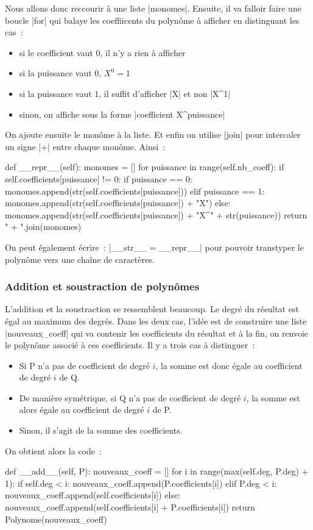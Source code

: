 		Nous allons donc reccourir à une liste \python|monomes|. Ensuite, il va falloir faire une boucle \python|for| qui balaye les coeffiicents du polynôme à afficher en distinguant les cas~:
		\begin{itemize}
			\item si le coefficient vaut $0$, il n'y a rien à afficher
			\item si la puissance vaut $0$, $X^0 = 1$
			\item si la puissance vaut $1$, il suffit d'afficher \python|X| et non \python|X^1|
			\item sinon, on affiche sous la forme \python|coefficient X^puissance|
		\end{itemize}
		On ajoute ensuite le monôme à la liste. Et enfin on utilise \python|join| pour intercaler un signe \python|+| entre chaque monôme. Ainsi~:
		\begin{pythoncode}
			def __repr__(self):
		    monomes = []
		    for puissance in range(self.nb_coeff):
		        if self.coefficients[puissance] != 0:
		            if puissance == 0:
		                monomes.append(str(self.coefficients[puissance]))
		            elif puissance == 1:
		                monomes.append(str(self.coefficients[puissance]) + "X")
		            else:
		                monomes.append(str(self.coefficients[puissance]) + "X^" + str(puissance))
		    return " + ".join(monomes)
		\end{pythoncode}
		
		On peut également écrire~: \python|__str__ = __repr__| pour pouvoir transtyper le polynôme vers une chaîne de caractères.
		
		\subsubsection{Addition et soustraction de polynômes}
		L'addition et la soustraction se ressemblent beaucoup. Le degré du résultat est égal au maximum des degrés. Dans les deux cas, l'idée est de construire une liste \python|nouveaux_coeff| qui va contenir les coefficients du résultat et à la fin, on renvoie le polynôme associé à ces coefficients. Il y a trois cas à distinguer~:
		\begin{itemize}
			\item Si P n'a pas de coefficient de degré $i$, la somme est donc égale au coefficient de degré $i$ de Q.
			\item De manière symétrique, si Q n'a pas de coefficient de degré $i$, la somme est alors égale au coefficient de degré $i$ de P.
			\item Sinon, il s'agit de la somme des coefficients.
		\end{itemize}
		On obtient alors la code~:
		\begin{pythoncode}
			def __add__(self, P):
				nouveaux_coeff = []
				for i in range(max(self.deg, P.deg) + 1):
				    if self.deg < i:
				        nouveaux_coeff.append(P.coefficients[i])
				    elif P.deg < i:
				        nouveaux_coeff.append(self.coefficients[i])
				    else:
				        nouveaux_coeff.append(self.coefficients[i] + P.coefficients[i])
				return Polynome(nouveaux_coeff)
		\end{pythoncode}
		
